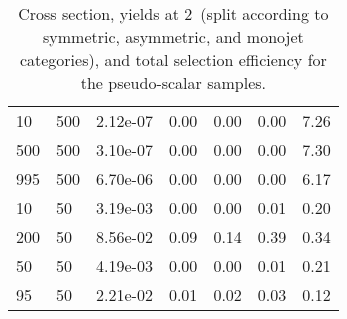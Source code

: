 \begin{table}
\begin{tabular}{lllllll}
10        &   500       &   2.12e-07  &   0.00      &   0.00      &   0.00      &   7.26      \\ 
500       &   500       &   3.10e-07  &   0.00      &   0.00      &   0.00      &   7.30      \\ 
995       &   500       &   6.70e-06  &   0.00      &   0.00      &   0.00      &   6.17      \\ 
10        &   50        &   3.19e-03  &   0.00      &   0.00      &   0.01      &   0.20      \\ 
200       &   50        &   8.56e-02  &   0.09      &   0.14      &   0.39      &   0.34      \\ 
50        &   50        &   4.19e-03  &   0.00      &   0.00      &   0.01      &   0.21      \\ 
95        &   50        &   2.21e-02  &   0.01      &   0.02      &   0.03      &   0.12      \\ 
\hline
\end{tabular}
\caption{Cross section, yields at 2~\ifb (split according to symmetric, asymmetric, and monojet categories), and total selection efficiency for the pseudo-scalar \DMtt samples.}
\label{tab:dm_DMttP_g1_2fb}
\end{table}
